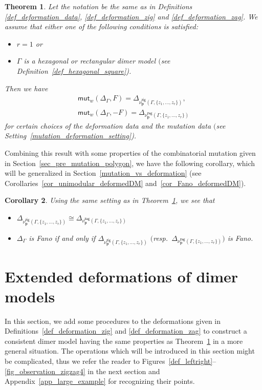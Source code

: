 \documentclass[pdftex]{sigma}%
\numberwithin{equation}{section}
\numberwithin{figure}{section}
\numberwithin{table}{section}
\newtheorem{Theorem}{Theorem}[section]
\newtheorem{Corollary}[Theorem]{Corollary}
\newcommand{\bfp}{\mathbf{p}}
\newcommand{\zig}{\mathsf{zig}}
\newcommand{\zag}{\mathsf{zag}}
\newcommand{\mutation}{\mathsf{mut}}
\begin{document}
\begin{Theorem}\label{mutation=deformation1}
Let the notation be the same as in Definitions {\rm \ref{def_deformation_data}}, {\rm \ref{def_deformation_zig}} and {\rm \ref{def_deformation_zag}}.
We assume that either one of the following conditions is satisfied:
\begin{itemize}\itemsep=0pt
\item[$(i)$] $r=1$ or
\item[$(ii)$] $\Gamma$ is a hexagonal or rectangular dimer model $($see Definition~{\rm \ref{def_hexagonal_square})}.
\end{itemize}
Then we have
\begin{gather*}
\mutation_{w}(\Delta_\Gamma,F)=\Delta_{\nu^\zig_\bfp(\Gamma,\{z_1,\dots,z_r\})},
\\
\mutation_{w}(\Delta_\Gamma,-F)=\Delta_{\nu^\zag_\bfp(\Gamma,\{z_1,\dots,z_r\})}
\end{gather*}
for certain choices of the deformation data and the mutation data $($see Setting~{\rm \ref{mutation_deformation_setting})}.
\end{Theorem}

Combining this result with some properties of the combinatorial mutation given in Section~\ref{sec_pre_mutation_polygon},
we have the following corollary, which will be generalized in Section~\ref{mutation_vs_deformation}
(see Corollaries~\ref{cor_unimodular_deformedDM} and~\ref{cor_Fano_deformedDM}).

\begin{Corollary}Using the same setting as in Theorem~{\rm \ref{mutation=deformation1}}, we see that
\begin{itemize}\itemsep=0pt
\item $\Delta_{\nu^\zig_\bfp(\Gamma,\{z_1,\dots,z_r\})}\cong \Delta_{\nu^\zag_\bfp(\Gamma,\{z_1,\dots,z_r\})}$
\item $\Delta_\Gamma$ is Fano if and only if $\Delta_{\nu^\zig_\bfp(\Gamma,\{z_1,\dots,z_r\})}$
$($resp.\ $\Delta_{\nu^\zag_\bfp(\Gamma,\{z_1,\dots,z_r\})}$$)$ is Fano.
\end{itemize}
\end{Corollary}

\section{Extended deformations of dimer models}\label{sec_def_exdeform}

In this section, we add some procedures to the deformations given in Definitions~\ref{def_deformation_zig} and \ref{def_deformation_zag}
to construct a consistent dimer model having the same properties as Theorem~\ref{mutation=deformation1} in a more general situation.
The operations which will be introduced in this section might be complicated, thus we refer the reader to Figures~\ref{def_leftright}--\ref{fig_observation_zigzag4}
in the next section and Appendix~\ref{app_large_example} for recognizing their points.
\end{document}
